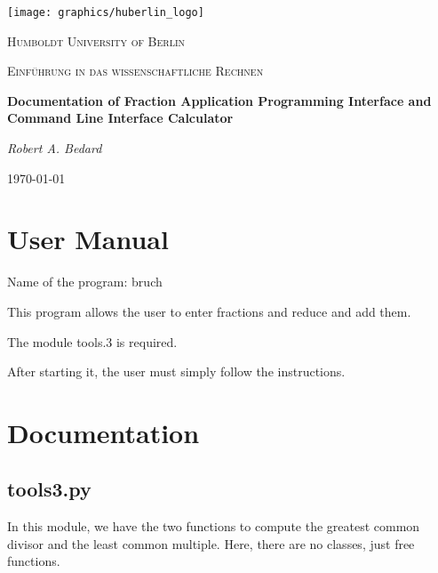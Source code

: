 \documentclass[refman]{scrartcl}
\begin{document}

\begin{titlepage}
	\centering
	\texttt{[image: graphics/huberlin\_logo]}\par\vspace{1cm}
	{\scshape\LARGE Humboldt University of Berlin \par}
	\vspace{1cm}
	{\scshape\Large Einf{\"u}hrung in das wissenschaftliche Rechnen \par}
	\vspace{1.5cm}
	{\huge\bfseries Documentation of Fraction Application Programming Interface and Command Line Interface Calculator\par}
	\vspace{2cm}
	{\Large\itshape Robert A. Bedard \par}
	\vfill

	\vfill

	{\large \today\par}
\end{titlepage}

\tableofcontents
\newpage

\section{User Manual}
Name of the program: bruch

\noindent This program allows the user to enter fractions and reduce and add them.

\noindent The module tools.3 is required.

\noindent After starting it, the user must simply follow the instructions.
\section{Documentation}

\subsection{tools3.py}

In this module, we have the two functions to compute the greatest common divisor and the least common multiple. Here, there are no classes, just free functions.
\end{document}
